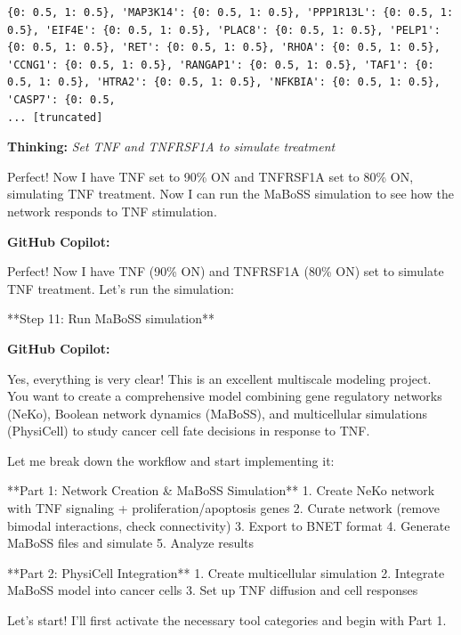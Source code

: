 \documentclass[11pt,a4paper]{article}
\begin{document}
\begin{toolokbox}
\begin{lstlisting}
{0: 0.5, 1: 0.5}, 'MAP3K14': {0: 0.5, 1: 0.5}, 'PPP1R13L': {0: 0.5, 1: 0.5}, 'EIF4E': {0: 0.5, 1: 0.5}, 'PLAC8': {0: 0.5, 1: 0.5}, 'PELP1': {0: 0.5, 1: 0.5}, 'RET': {0: 0.5, 1: 0.5}, 'RHOA': {0: 0.5, 1: 0.5}, 'CCNG1': {0: 0.5, 1: 0.5}, 'RANGAP1': {0: 0.5, 1: 0.5}, 'TAF1': {0: 0.5, 1: 0.5}, 'HTRA2': {0: 0.5, 1: 0.5}, 'NFKBIA': {0: 0.5, 1: 0.5}, 'CASP7': {0: 0.5, 
... [truncated]
\end{lstlisting}
\end{toolokbox}
\begin{thinkbox}
\textbf{Thinking:} \textit{Set TNF and TNFRSF1A to simulate treatment}

Perfect! Now I have TNF set to 90\% ON and TNFRSF1A set to 80\% ON, simulating TNF treatment. Now I can run the MaBoSS simulation to see how the network responds to TNF stimulation.

\end{thinkbox}
\begin{copilotbox}
\textbf{GitHub Copilot:}

Perfect! Now I have TNF (90\% ON) and TNFRSF1A (80\% ON) set to simulate TNF treatment. Let's run the simulation:

**Step 11: Run MaBoSS simulation**

\end{copilotbox}
\begin{copilotbox}
\textbf{GitHub Copilot:}

Yes, everything is very clear! This is an excellent multiscale modeling project. You want to create a comprehensive model combining gene regulatory networks (NeKo), Boolean network dynamics (MaBoSS), and multicellular simulations (PhysiCell) to study cancer cell fate decisions in response to TNF.

Let me break down the workflow and start implementing it:

**Part 1: Network Creation \& MaBoSS Simulation**
1. Create NeKo network with TNF signaling + proliferation/apoptosis genes
2. Curate network (remove bimodal interactions, check connectivity)
3. Export to BNET format
4. Generate MaBoSS files and simulate
5. Analyze results

**Part 2: PhysiCell Integration**
1. Create multicellular simulation
2. Integrate MaBoSS model into cancer cells
3. Set up TNF diffusion and cell responses

Let's start! I'll first activate the necessary tool categories and begin with Part 1.

\end{copilotbox}
\end{document}
